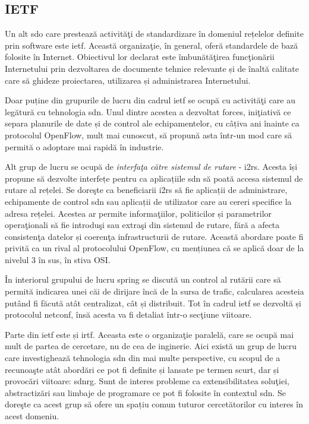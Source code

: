 \subsection{IETF}

Un alt \gls{sdo} care prestează activităţi de standardizare în domeniul rețelelor definite prin software este \gls{ietf}. Această organizaţie, în general, oferă standardele de bază folosite în Internet. Obiectivul lor declarat este îmbunătăţirea funcţionării Internetului prin dezvoltarea de documente tehnice relevante și de înaltă calitate care să ghideze proiectarea, utilizarea și administrarea Internetului.

Doar puține din grupurile de lucru din cadrul \gls{ietf} se ocupă cu activităţi care au legătură cu tehnologia \gls{sdn}. Unul dintre acestea a dezvoltat \gls{forces}, iniţiativă ce separa planurile de date și de control ale echipamentelor, cu câțiva ani înainte ca protocolul OpenFlow, mult mai cunoscut, să propună asta într-un mod care să permită o adoptare mai rapidă în industrie.

Alt grup de lucru se ocupă de \textit{interfaţa către sistemul de rutare} - \gls{i2rs}. Acesta își propune să dezvolte interfețe pentru ca aplicațiile \gls{sdn} să poată accesa sistemul de rutare al rețelei. Se doreşte ca beneficiarii \gls{i2rs} să fie aplicații de administrare, echipamente de control \gls{sdn} sau aplicații de utilizator care au cereri specifice la adresa rețelei. Acestea ar permite informaţiilor, politicilor și parametrilor operaţionali să fie introduşi sau extraşi din sistemul de rutare, fără a afecta consistenţa datelor și coerenţa infrastructurii de rutare. Această abordare poate fi privită ca un rival al protocolului OpenFlow, cu mențiunea că se aplică doar de la nivelul 3 în sus, în stiva OSI.

În interiorul grupului de lucru \gls{spring} se discută un control al rutării care să permită indicarea unei căi de dirijare încă de la sursa de trafic, calcularea acesteia putând fi făcută atât centralizat, cât și distribuit. Tot în cadrul \gls{ietf} se dezvoltă și protocolul \gls{netconf}, însă acesta va fi detaliat într-o secţiune viitoare.

Parte din \gls{ietf} este și \gls{irtf}. Aceasta este o organizaţie paralelă, care se ocupă mai mult de partea de cercetare, nu de cea de inginerie. Aici există un grup de lucru care investighează tehnologia \gls{sdn} din mai multe perspective, cu scopul de a recunoaşte atât abordări ce pot fi definite și lansate pe termen scurt, dar și provocări viitoare: \gls{sdnrg}. Sunt de interes probleme ca extensibilitatea soluţiei, abstractizări sau limbaje de programare ce pot fi folosite în contextul \gls{sdn}. Se doreşte ca acest grup să ofere un spațiu comun tuturor cercetătorilor cu interes în acest domeniu.

